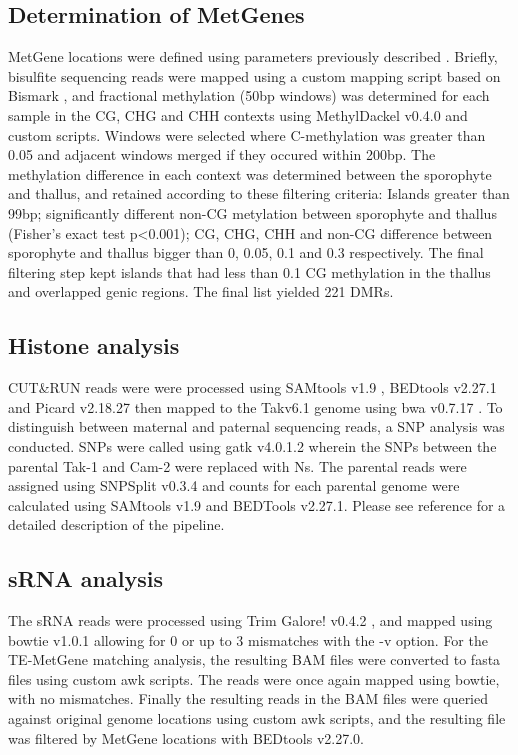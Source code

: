 \subsection{Determination of MetGenes}

MetGene locations were defined using parameters previously described \citep{jimmythesis}. Briefly, bisulfite sequencing reads were mapped using a custom mapping script based on Bismark \citep{RN229}, and fractional methylation (50bp windows) was determined for each sample in the  CG, CHG and CHH contexts using MethylDackel v0.4.0 and custom scripts. Windows were selected where C-methylation was greater than 0.05 and adjacent windows merged if they occured within 200bp. The methylation difference in each context was determined between the sporophyte and thallus, and retained according to these filtering criteria: Islands greater than 99bp; significantly different non-CG metylation between sporophyte and thallus (Fisher's exact test p<0.001); CG, CHG, CHH and non-CG difference between sporophyte and thallus bigger than 0, 0.05, 0.1 and 0.3 respectively. The final filtering step kept islands that had less than 0.1 CG methylation in the thallus and overlapped genic regions. The final list yielded 221 DMRs.

\subsection{Histone analysis}

CUT\&RUN reads were were processed using SAMtools v1.9 \citep{RN174}, BEDtools v2.27.1 \citep{RN90} and Picard v2.18.27 \citep{RN173} then mapped to the Takv6.1 genome \citep{RN179} using bwa v0.7.17 \citep{RN182}. To distinguish between maternal and paternal sequencing reads, a SNP analysis was conducted. SNPs were called using gatk v4.0.1.2 \citep{RN177} wherein the SNPs between the parental Tak-1 and Cam-2 were replaced with Ns. The parental reads were assigned using SNPSplit v0.3.4 \citep{RN178} and counts for each parental genome were calculated using SAMtools v1.9 and BEDTools v2.27.1. Please see reference \cite{RN160}  for a detailed description of the pipeline. 

\subsection{sRNA analysis}

The sRNA reads were processed using Trim Galore! v0.4.2 \citep{trim_galore}, and mapped using bowtie v1.0.1 \citep{RN89} allowing for 0 or up to 3 mismatches with the -v option. For the TE-MetGene matching analysis, the resulting BAM files were converted to fasta files using custom awk scripts. The reads were once again mapped using bowtie, with no mismatches. Finally the resulting reads in the BAM files were queried against original genome locations using custom awk scripts, and the resulting file was filtered by MetGene locations with BEDtools v2.27.0.

